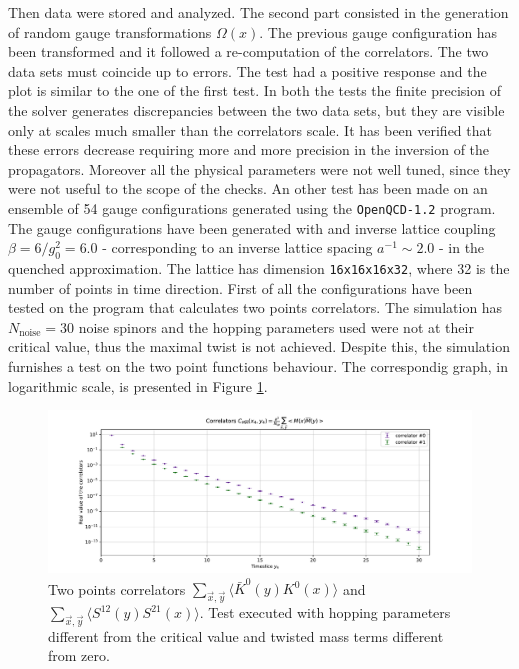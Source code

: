\documentclass[english, LaM, oneside, noexaminfo]{sapthesis}
\newcommand{\la}{\langle}
\newcommand{\ra}{\rangle}
\newcommand{\gev}{\text{ GeV}}
\begin{document}
Then data were stored and analyzed.
The second part consisted in the generation of random gauge transformations $\Omega (x)$.
The previous gauge configuration has been transformed and it followed a re-computation of the correlators.
The two data sets must coincide up to errors.
The test had a positive response and the plot is similar to the one of the first test.
In both the tests the finite precision of the solver generates discrepancies between the two data sets, but they are visible only at scales much smaller than the correlators scale.
It has been verified that these errors decrease requiring more and more precision in the inversion of the propagators.
Moreover all the physical parameters were not well tuned, since they were not useful to the scope of the checks. 
\newline
An other test has been made on an ensemble of 54 gauge configurations generated using the \texttt{OpenQCD-1.2} program.
The gauge configurations have been generated with and inverse lattice coupling $\beta = 6/g_0^2 = 6.0$ - corresponding to an inverse lattice spacing $a^{-1} \sim 2.0$ \gev \cite{exploring-tmQCD-clover-term} - in the quenched approximation.
The lattice has dimension \texttt{16x16x16x32}, where 32 is the number of points in time direction.
First of all the configurations have been tested on the program that calculates two points correlators.
The simulation has $N_\text{noise} = 30$ noise spinors and the hopping parameters used were not at their critical value, thus the maximal twist is not achieved.
Despite this, the simulation furnishes a test on the two point functions behaviour.
The correspondig graph, in logarithmic scale, is presented in Figure \ref{fig:plot-2pts}.
\begin{figure}[!h]
    \centering
    \includegraphics[width=\textwidth]{imgs-MSc-thesis/pureYM-2pts.pdf}
    \caption{Two points correlators $\sum_{\vec x, \vec y} \la \bar K^0 (y) K^0 (x) \ra$ and $\sum_{\vec x, \vec y} \la S^{12} (y) S^{21} (x) \ra$.
        Test executed with hopping parameters different from the critical value and twisted mass terms different from zero.}
    \label{fig:plot-2pts}
\end{figure}
\end{document}
